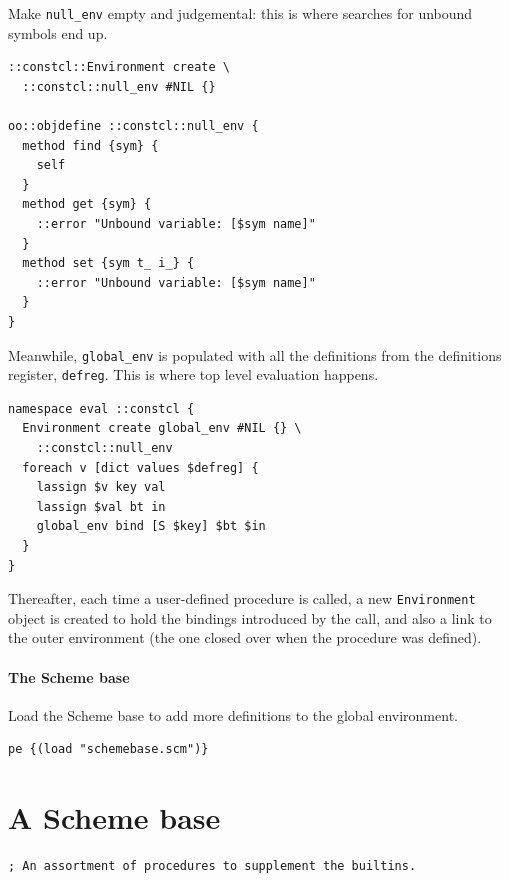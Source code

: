 \documentclass[twoside]{report}
\begin{document}
Make \texttt{null\_env} empty and judgemental: this is where searches for unbound symbols end up.

\begin{lstlisting}
::constcl::Environment create \
  ::constcl::null_env #NIL {}

oo::objdefine ::constcl::null_env {
  method find {sym} {
    self
  }
  method get {sym} {
    ::error "Unbound variable: [$sym name]"
  }
  method set {sym t_ i_} {
    ::error "Unbound variable: [$sym name]"
  }
}
\end{lstlisting}

Meanwhile, \texttt{global\_env} is populated with all the definitions from the definitions register, \texttt{defreg}. This is where top level evaluation happens.
\index{global\_env environment}

\begin{lstlisting}
namespace eval ::constcl {
  Environment create global_env #NIL {} \
    ::constcl::null_env
  foreach v [dict values $defreg] {
    lassign $v key val
    lassign $val bt in
    global_env bind [S $key] $bt $in
  }
}
\end{lstlisting}

Thereafter, each time a user-defined procedure is called, a new \texttt{Environment} object is created to hold the bindings introduced by the call, and also a link to the outer environment (the one closed over when the procedure was defined).

\subsubsection{The Scheme base}
\label{the-scheme-base}

Load the Scheme base to add more definitions to the global environment.

\begin{lstlisting}
pe {(load "schemebase.scm")}
\end{lstlisting}

\chapter{A Scheme base}
\label{a-scheme-base}

\begin{lstlisting}
; An assortment of procedures to supplement the builtins.
\end{lstlisting}
\end{document}
